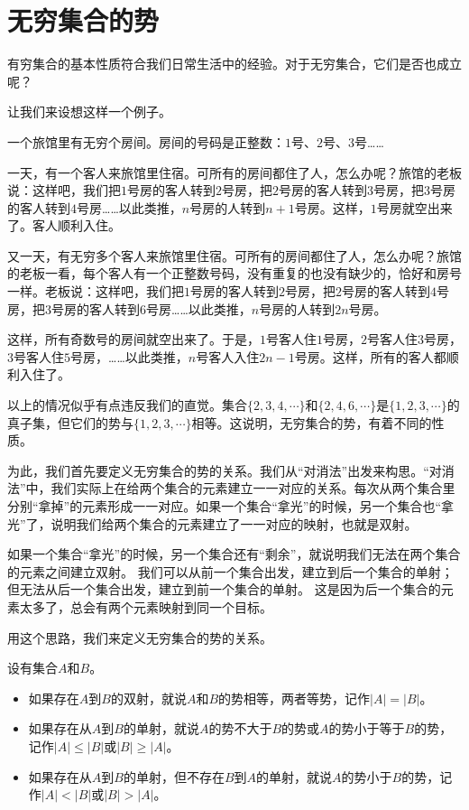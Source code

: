 \documentclass[12pt,UTF8,fontset=none]{ctexbook}
\begin{document}
\section{无穷集合的势}

有穷集合的基本性质符合我们日常生活中的经验。对于无穷集合，它们是否也成立呢？

让我们来设想这样一个例子。

一个旅馆里有无穷个房间。房间的号码是正整数：$1$号、$2$号、$3$号……

一天，有一个客人来旅馆里住宿。可所有的房间都住了人，怎么办呢？旅馆的老板说：这样吧，我们把$1$号房的客人转到$2$号房，把$2$号房的客人转到$3$号房，把$3$号房的客人转到$4$号房……以此类推，$n$号房的人转到$n+1$号房。这样，$1$号房就空出来了。客人顺利入住。

又一天，有无穷多个客人来旅馆里住宿。可所有的房间都住了人，怎么办呢？旅馆的老板一看，每个客人有一个正整数号码，没有重复的也没有缺少的，恰好和房号一样。老板说：这样吧，我们把$1$号房的客人转到$2$号房，把$2$号房的客人转到$4$号房，把$3$号房的客人转到$6$号房……以此类推，$n$号房的人转到$2n$号房。

这样，所有奇数号的房间就空出来了。于是，$1$号客人住$1$号房，$2$号客人住$3$号房，$3$号客人住$5$号房，……以此类推，$n$号客人入住$2n-1$号房。这样，所有的客人都顺利入住了。

以上的情况似乎有点违反我们的直觉。集合$\{2,3,4,\cdots\}$和$\{2,4,6,\cdots\}$是$\{1,2,3,\cdots\}$的真子集，但它们的势与$\{1,2,3,\cdots\}$相等。这说明，无穷集合的势，有着不同的性质。

为此，我们首先要定义无穷集合的势的关系。我们从“对消法”出发来构思。“对消法”中，我们实际上在给两个集合的元素建立一一对应的关系。每次从两个集合里分别“拿掉”的元素形成一一对应。如果一个集合“拿光”的时候，另一个集合也“拿光”了，说明我们给两个集合的元素建立了一一对应的映射，也就是双射。

如果一个集合“拿光”的时候，另一个集合还有“剩余”，就说明我们无法在两个集合的元素之间建立双射。
我们可以从前一个集合出发，建立到后一个集合的单射；但无法从后一个集合出发，建立到前一个集合的单射。
这是因为后一个集合的元素太多了，总会有两个元素映射到同一个目标。

用这个思路，我们来定义无穷集合的势的关系。

\begin{df}\label{df:1-0-0}
    设有集合$A$和$B$。
    \begin{itemize}
        \item 如果存在$A$到$B$的双射，就说$A$和$B$的势相等，两者等势，记作$|A| = |B|$。
        \item 如果存在从$A$到$B$的单射，就说$A$的势不大于$B$的势或$A$的势小于等于$B$的势，记作$|A| \leqslant |B|$或$|B| \geqslant |A|$。
        \item 如果存在从$A$到$B$的单射，但不存在$B$到$A$的单射，就说$A$的势小于$B$的势，记作$|A| < |B|$或$|B| > |A|$。
    \end{itemize}
\end{df}
\end{document}
